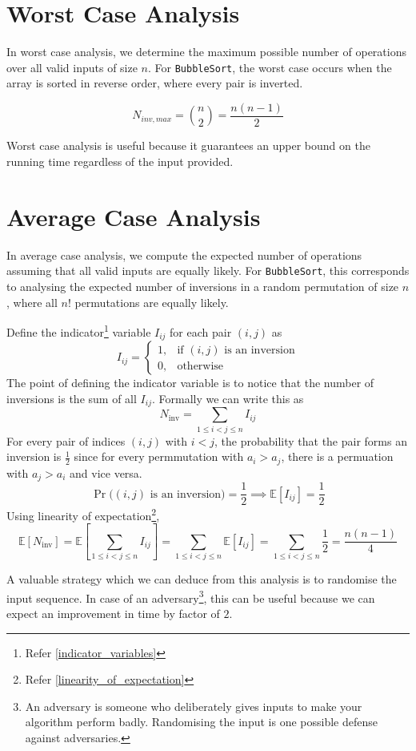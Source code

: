 \section{Worst Case Analysis}

In worst case analysis, we determine the maximum possible number of operations over all valid 
inputs of size \(n\). For \texttt{BubbleSort}, the worst case occurs when the array is 
sorted in reverse order, where every pair is inverted. 

\[N_{inv,max}=\binom{n}{2}=
\frac{n(n-1)}{2}
\]

\noindent Worst case analysis is useful because it guarantees an upper bound 
on the running time regardless of the input provided.

\section{Average Case Analysis} 

In average case analysis, we compute the expected number of operations 
assuming that all valid inputs are equally likely. For \texttt{BubbleSort}, this corresponds 
to analysing the expected number of inversions in a random permutation of size \(n\), where all 
$n!$ permutations are equally likely.

\noindent Define the indicator\footnote{Refer \autoref{indicator_variables}} variable $I_{ij}$ 
for each pair \((i,j)\) as
\[
I_{ij}=
\begin{cases}
1,&\text{if }(i,j)\text{ is an inversion}\\
0,&\text{otherwise}
\end{cases}
\]
The point of defining the indicator variable is to notice that the number 
of inversions is the sum of all $I_{ij}$. Formally we can write this as 
\[
N_{\mathrm{inv}}=\sum_{1\le i<j\le n}I_{ij}
\]
For every pair of indices \((i,j)\) with \(i<j\), the probability that the pair 
forms an inversion is $\frac{1}{2}$ since for every permmutation with $a_i>a_j$, 
there is a permuation with $a_j>a_i$ and vice versa.
\[
\Pr\big((i,j)\text{ is an inversion}\big)=\frac{1}{2} \implies \mathbb{E}[I_{ij}]
=
\frac{1}{2}
\]
Using linearity of expectation\footnote{Refer \autoref{linearity_of_expectation}}, 
\[
\mathbb{E}[N_{\mathrm{inv}}]
=
\mathbb{E}\left[\sum_{1\le i<j\le n}I_{ij}\right]
=
\sum_{1\le i<j\le n}\mathbb{E}[I_{ij}]
=
\sum_{1\le i<j\le n}\frac{1}{2}
=
\frac{n(n-1)}{4}
\]

\noindent A valuable strategy which we can deduce from this analysis is to randomise the 
input sequence. In case of an adversary\footnote{An adversary is someone who deliberately 
gives inputs to make your algorithm perform badly. Randomising the input is one possible defense 
against adversaries.}, this can be useful because we 
can expect an improvement in time by factor of $2$.

